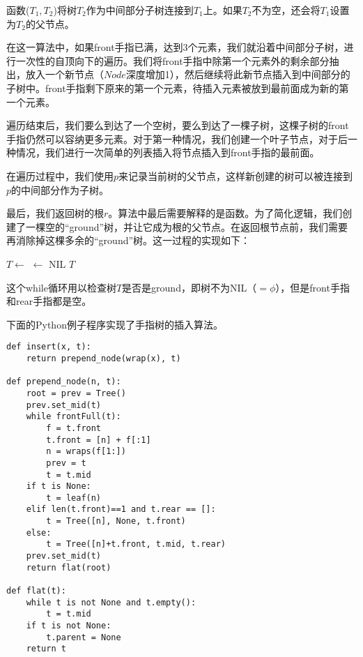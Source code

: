 \documentclass[UTF8]{article}
\begin{document}
函数($T_1, T_2$)将树$T_2$作为中间部分子树连接到$T_1$上。如果$T_2$不为空，还会将$T_1$设置为$T_2$的父节点。

在这一算法中，如果front手指已满，达到3个元素，我们就沿着中间部分子树，进行一次性的自顶向下的遍历。我们将front手指中除第一个元素外的剩余部分抽出，放入一个新节点（$Node$深度增加1），然后继续将此新节点插入到中间部分的子树中。front手指剩下原来的第一个元素，待插入元素被放到最前面成为新的第一个元素。

遍历结束后，我们要么到达了一个空树，要么到达了一棵子树，这棵子树的front手指仍然可以容纳更多元素。对于第一种情况，我们创建一个叶子节点，对于后一种情况，我们进行一次简单的列表插入将节点插入到front手指的最前面。

在遍历过程中，我们使用$p$来记录当前树的父节点，这样新创建的树可以被连接到$p$的中间部分作为子树。

最后，我们返回树的根$r$。算法中最后需要解释的是函数。为了简化逻辑，我们创建了一棵空的“ground”树，并让它成为根的父节点。在返回根节点前，我们需要再消除掉这棵多余的“ground”树。这一过程的实现如下：

\begin{algorithmic}
    \State $T \gets$ 
  \EndWhile
    \State {} $\gets $ NIL
  \EndIf
  \State \Return $T$
\EndFunction
\end{algorithmic}

这个while循环用以检查树$T$是否是ground，即树不为NIL（$=\phi$），但是front手指和rear手指都是空。

下面的Python例子程序实现了手指树的插入算法。

\lstset{language=Python}
\begin{lstlisting}
def insert(x, t):
    return prepend_node(wrap(x), t)

def prepend_node(n, t):
    root = prev = Tree()
    prev.set_mid(t)
    while frontFull(t):
        f = t.front
        t.front = [n] + f[:1]
        n = wraps(f[1:])
        prev = t
        t = t.mid
    if t is None:
        t = leaf(n)
    elif len(t.front)==1 and t.rear == []:
        t = Tree([n], None, t.front)
    else:
        t = Tree([n]+t.front, t.mid, t.rear)
    prev.set_mid(t)
    return flat(root)

def flat(t):
    while t is not None and t.empty():
        t = t.mid
    if t is not None:
        t.parent = None
    return t
\end{lstlisting}
\end{document}
